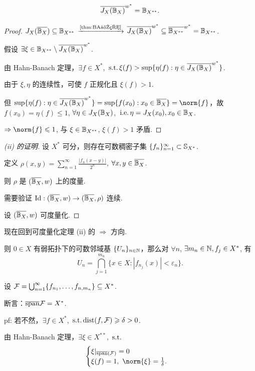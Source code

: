 \begin{lemma}[Goldstine 引理]
    $$\overline{J_X(\mathbb{B}_X)}^{w^*} = \mathbb{B}_{X^{**}}.$$
\end{lemma}

\begin{proof}
    \fbox{$\subseteq$} $J_X(\overline{\mathbb{B}_X})\subseteq \mathbb{B}_{X^{**}}$ $\xrightarrow{\text{\cref{thm:BA定理}}}$ $\overline{J_X(\mathbb{B}_X)}^{w^*}\subseteq \overline{\mathbb{B}_{X^{**}}}^{w^*} = \mathbb{B}_{X^{**}}$.\par
    \fbox{$=$} 假设 $\exists \xi\in \mathbb{B}_{X^{**}}\setminus \overline{J_X(\mathbb{B}_X)}^{w^*}$.\par
    由 Hahn-Banach 定理，$\exists f\in X^*$, $\operatorname{\,\text{s.t.}} \xi(f) > \sup\{\eta(f): \eta\in \overline{J_X(\mathbb{B}_X)}^{w^*}\}$.\par
    由于 $\xi, \eta$ 的连续性，可使 $f$ 正规化且 $\xi(f)>1$.\par
    但 $\sup\{\eta(f): \eta\in \overline{J_X(\mb{B}_X)}^{w^*}\} = \sup\{f(x_0): x_0\in \overline{\mb{B}_X}\} = \norm{f}$，故
    $f(x_0)=\eta(f)\leq 1$, $\forall \eta\in J_X(\mathbb{B}_X)$, $\operatorname{\,\text{i.e.}} \eta=J_X(x_0), x_0\in \mathbb{B}_X$.\par
    $\Rightarrow \norm{f}\leq 1$, 与 $\xi\in \mathbb{B}_{X^{**}}$, $\xi(f)>1$ 矛盾.
\end{proof}

\begin{proof}[(ii) 的证明]
    \fbox{$\Leftarrow$} 设 $X^*$ 可分，则存在可数稠密子集 $\{f_n\}_{n=1}^\infty \subset \mathbb{S}_{X^*}$.\par
    定义 $\rho(x,y) = \sum_{n=1}^\infty \frac{|f_n(x-y)|}{2^n}$, $\forall x,y\in \overline{\mathbb{B}_X}$.\par
    则 $\rho$ 是 $(\overline{\mathbb{B}_X}, w)$ 上的度量.\par
    需要验证 $\mathrm{Id}: (\overline{\mathbb{B}_X}, w)\to (\overline{\mathbb{B}_X}, \rho)$ 连续.

    \fbox{$\Rightarrow$} 设 $(\overline{\mathbb{B}_X}, w)$ 可度量化.
\end{proof}





现在回到可度量化定理 (ii) 的 $\Rightarrow$ 方向.

则 $0\in X$ 有弱拓扑下的可数邻域基 $\{U_n\}_{n\in \mathbb{N}}$，那么对 $\forall n$, $\exists m_n\in \mathbb{N}, f_j\in X^*$, 有
\[
U_n = \bigcap_{j=1}^{m_n} \{x\in X: |f_{n_j}(x)|<\varepsilon_n\}.
\]

设 $\mathcal{F} = \bigcup_{n=1}^\infty \{f_{n_1},\ldots, f_{n,m_n}\} \subseteq X^*$.\par
断言：$\overline{\operatorname{span}}\mathcal{F} = X^*$.\par
pf: 若不然，$\exists f\in X^*$, $\operatorname{\,\text{s.t.}} \operatorname{dist}(f, \mathcal{F})\geqslant \delta>0$.\par
由 Hahn-Banach 定理，$\exists \xi\in X^{**}$, $\operatorname{\,\text{s.t.}}$
\[
\begin{cases} \xi|_{\overline{\spann}(\mcal{F})} = 0\\ \xi(f)=1,\ \norm{\xi}=\frac{1}{\delta}. \end{cases}
\]

